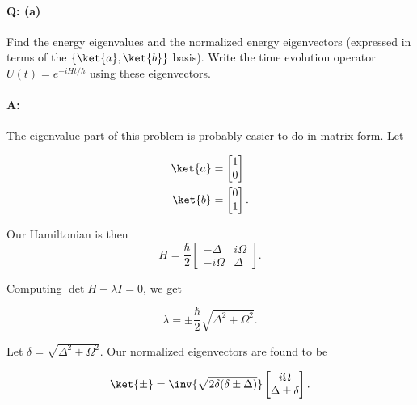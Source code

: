 \paragraph{Q: (a)} Find the energy eigenvalues and the normalized energy eigenvectors (expressed in terms of the $\{\ket{a}, \ket{b}\}$ basis).  Write the time evolution operator $U(t) = e^{-i H t/\hbar}$ using these eigenvectors.

\paragraph{A:}

The eigenvalue part of this problem is probably easier to do in matrix form.  Let 

\begin{align}\label{eqn:qmIexamPractice2008Dec:2:20}
\ket{a} &= 
\begin{bmatrix}
1 \\
0
\end{bmatrix} \\
\ket{b} &= 
\begin{bmatrix}
0 \\
1
\end{bmatrix}.
\end{align}

Our Hamiltonian is then
\begin{equation}\label{eqn:qmIexamPractice2008Dec:2:30}
H = \frac{\hbar}{2} 
\begin{bmatrix}
-\Delta & i \Omega \\
-i \Omega & \Delta
\end{bmatrix}.
\end{equation}

Computing $\det{H - \lambda I} = 0$, we get

\begin{equation}\label{eqn:qmIexamPractice2008Dec:2:40}
\lambda = \pm \frac{\hbar}{2} \sqrt{ \Delta^2 + \Omega^2 }.
\end{equation}

Let $\delta = \sqrt{ \Delta^2 + \Omega^2 }$.  Our normalized eigenvectors are found to be

\begin{equation}\label{eqn:qmIexamPractice2008Dec:2:50}
\ket{\pm} = \inv{\sqrt{ 2 \delta (\delta \pm \Delta)} }
\begin{bmatrix}
i \Omega \\
\Delta \pm \delta
\end{bmatrix}.
\end{equation}

